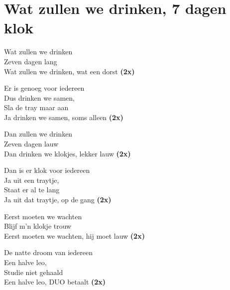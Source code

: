 \section{Wat zullen we drinken, 7 dagen klok}
Wat zullen we drinken\\
Zeven dagen lang\\
Wat zullen we drinken, wat een dorst \textbf{(2x)}

Er is genoeg voor iedereen\\
Dus drinken we samen,\\
Sla de tray maar aan\\
Ja drinken we samen, soms alleen \textbf{(2x)}

Dan zullen we drinken\\
Zeven dagen lauw\\
Dan drinken we klokjes, lekker lauw \textbf{(2x)}

Dan is er klok voor iedereen\\
Ja uit een traytje,\\
Staat er al te lang\\
Ja uit dat traytje, op de gang \textbf{(2x)}

Eerst moeten we wachten\\
Blijf m'n klokje trouw\\
Eerst moeten we wachten, hij moet lauw \textbf{(2x)}

De natte droom van iedereen\\
Een halve leo,\\
Studie niet gehaald\\
Een halve leo, DUO betaalt \textbf{(2x)}
